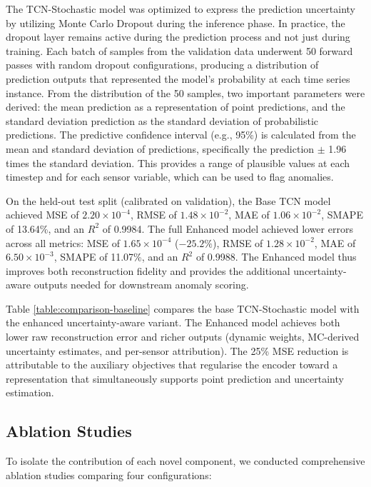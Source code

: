 The TCN-Stochastic model was optimized to express the prediction uncertainty by utilizing Monte Carlo Dropout during the inference phase. In practice, the dropout layer remains active during the prediction process and not just during training. Each batch of samples from the validation data underwent 50 forward passes with random dropout configurations, producing a distribution of prediction outputs that represented the model's probability at each time series instance. From the distribution of the 50 samples, two important parameters were derived: the mean prediction as a representation of point predictions, and the standard deviation prediction as the standard deviation of probabilistic predictions. The predictive confidence interval (e.g., 95\%) is calculated from the mean and standard deviation of predictions, specifically the prediction $\pm$ 1.96 times the standard deviation. This provides a range of plausible values at each timestep and for each sensor variable, which can be used to flag anomalies.

On the held-out test split (calibrated on validation), the Base TCN model achieved MSE of $2.20\times 10^{-4}$, RMSE of $1.48\times 10^{-2}$, MAE of $1.06\times 10^{-2}$, SMAPE of 13.64\%, and an $R^2$ of 0.9984. The full Enhanced model achieved lower errors across all metrics: MSE of $1.65\times 10^{-4}$ ($-25.2\%$), RMSE of $1.28\times 10^{-2}$, MAE of $6.50\times 10^{-3}$, SMAPE of 11.07\%, and an $R^2$ of 0.9988. The Enhanced model thus improves both reconstruction fidelity and provides the additional uncertainty-aware outputs needed for downstream anomaly scoring.



Table \ref{table:comparison-baseline} compares the base TCN-Stochastic model with the enhanced uncertainty-aware variant. The Enhanced model achieves both lower raw reconstruction error and richer outputs (dynamic weights, MC-derived uncertainty estimates, and per-sensor attribution). The 25\% MSE reduction is attributable to the auxiliary objectives that regularise the encoder toward a representation that simultaneously supports point prediction and uncertainty estimation.

\subsection{Ablation Studies}
To isolate the contribution of each novel component, we conducted comprehensive ablation studies comparing four configurations:

